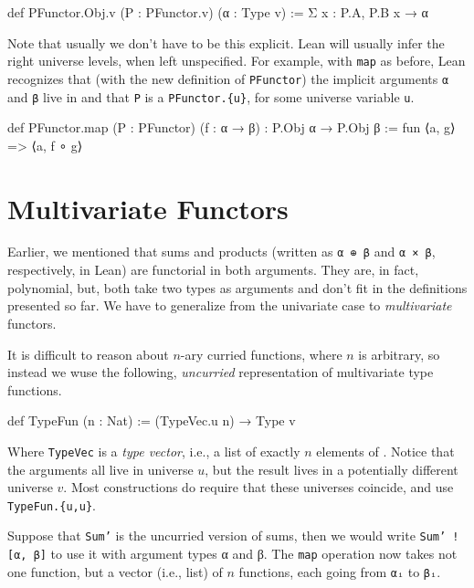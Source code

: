 \documentclass[titlepage]{report}
\newcommand\Typen[1]{\lean{Type #1}}
\begin{document}
\begin{leancode}
    def PFunctor.Obj.{v} (P : PFunctor.{v}) (α : Type v)
        := Σ x : P.A, P.B x → α
\end{leancode}

Note that usually we don't have to be this explicit. Lean will usually infer the right universe levels, when left unspecified.
For example, with \texttt{map} as before, Lean recognizes that (with the new definition of \texttt{PFunctor}) the implicit arguments \texttt{α} and \texttt{β} live in \Typen{u} and that \texttt{P} is a \texttt{PFunctor.\{u\}}, for some universe variable \texttt{u}.
\begin{leancode}
    def PFunctor.map (P : PFunctor) (f : α → β) : P.Obj α → P.Obj β 
        := fun ⟨a, g⟩ => ⟨a, f ∘ g⟩    
\end{leancode}


\section{Multivariate Functors}
Earlier, we mentioned that sums and products (written as \texttt{α ⊕ β} and \texttt{α × β}, respectively, in Lean) are functorial in both arguments.
They are, in fact, polynomial, but, both take two types as arguments and don't fit in the definitions presented so far. We have to generalize from the univariate case to \emph{multivariate} functors.

It is difficult to reason about $n$-ary curried functions, where $n$ is arbitrary, so instead we wuse the following, \emph{uncurried} representation of multivariate type functions.

\begin{leancode}
    def TypeFun (n : Nat) := (TypeVec.{u} n) → Type v
\end{leancode}
Where \texttt{TypeVec} is a \emph{type vector}, i.e., a list of exactly $n$ elements of \Typen{u}.
Notice that the arguments all live in universe $u$, but the result lives in a potentially different universe $v$. 
Most constructions do require that these universes coincide, and use \texttt{TypeFun.\{u,u\}}.

Suppose that \texttt{Sum'} is the uncurried version of sums, then we would write \texttt{Sum' ![α, β]} to use it with argument types α and β. The \texttt{map} operation now takes not one function, but a vector (i.e., list) of $n$ functions, each going from \texttt{αᵢ} to \texttt{βᵢ}. 
\end{document}
